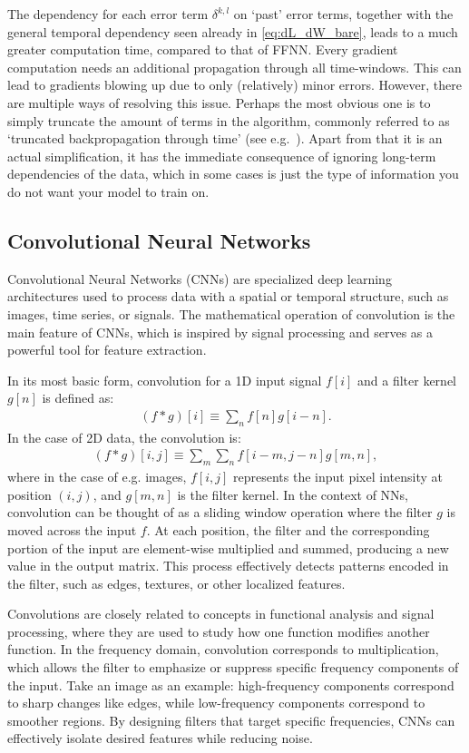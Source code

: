 \documentclass[%
reprint,
amsmath,amssymb,
aps,
]{revtex4-2}
\begin{document}
The dependency for each error term \(\delta^{k,l}\) on `past' error terms, together with the general temporal dependency seen already in \eqref{eq:dL_dW_bare}, leads to a much greater computation time, compared to that of FFNN. Every gradient computation needs an additional propagation through all time-windows. This can lead to gradients blowing up due to only (relatively) minor errors. However, there are multiple ways of resolving this issue. Perhaps the most obvious one is to simply truncate the amount of terms in the algorithm, commonly referred to as `truncated backpropagation through time' (see e.g.~\cite{tallec2017unbiasingtruncatedbackpropagationtime}). Apart from that it is an actual simplification, it has the immediate consequence of ignoring long-term dependencies of the data, which in some cases is just the type of information you do not want your model to train on.

\subsection{Convolutional Neural Networks}  
Convolutional Neural Networks (CNNs) are specialized deep learning architectures used to process data with a spatial or temporal structure, such as images, time series, or signals. The mathematical operation of convolution is the main feature of CNNs, which is inspired by signal processing and serves as a powerful tool for feature extraction.

In its most basic form, convolution for a 1D input signal $f[i]$ and a filter kernel $g[n]$ is defined as:
\begin{align}
	(f*g)[i]\equiv\sum_{n}f[n]g[i-n].
\end{align}
In the case of 2D data, the convolution is:
\begin{align}
	(f*g)[i,j]\equiv\sum_{m}\sum_{n}f[i-m,j-n]g[m,n],
\end{align}
where in the case of e.g. images, $f[i,j]$ represents the input pixel intensity at position $(i,j)$, and $g[m,n]$ is the filter kernel. In the context of NNs, convolution can be thought of as a sliding window operation where the filter $g$ is moved across the input $f$. At each position, the filter and the corresponding portion of the input are element-wise multiplied and summed, producing a new value in the output matrix. This process effectively detects patterns encoded in the filter, such as edges, textures, or other localized features.

Convolutions are closely related to concepts in functional analysis and signal processing, where they are used to study how one function modifies another function. In the frequency domain, convolution corresponds to multiplication, which allows the filter to emphasize or suppress specific frequency components of the input. Take an image as an example: high-frequency components correspond to sharp changes like edges, while low-frequency components correspond to smoother regions. By designing filters that target specific frequencies, CNNs can effectively isolate desired features while reducing noise.
\end{document}
